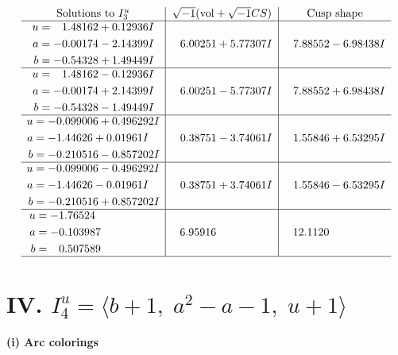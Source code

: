 \documentclass[1p]{elsarticle_modified}
\theoremstyle{definition}
\newcommand{\I}{\sqrt{-1}}
\begin{document}
$$\begin{array}{c|c|c}  
\text{Solutions to }I^u_{3}& \I (\text{vol} + \sqrt{-1}CS) & \text{Cusp shape}\\
 \hline 
\begin{aligned}
u &= \phantom{-}1.48162 + 0.12936 I \\
a &= -0.00174 - 2.14399 I \\
b &= -0.54328 + 1.49449 I\end{aligned}
 & \phantom{-}6.00251 + 5.77307 I & \phantom{-}7.88552 - 6.98438 I \\ \hline\begin{aligned}
u &= \phantom{-}1.48162 - 0.12936 I \\
a &= -0.00174 + 2.14399 I \\
b &= -0.54328 - 1.49449 I\end{aligned}
 & \phantom{-}6.00251 - 5.77307 I & \phantom{-}7.88552 + 6.98438 I \\ \hline\begin{aligned}
u &= -0.099006 + 0.496292 I \\
a &= -1.44626 + 0.01961 I \\
b &= -0.210516 - 0.857202 I\end{aligned}
 & \phantom{-}0.38751 - 3.74061 I & \phantom{-}1.55846 + 6.53295 I \\ \hline\begin{aligned}
u &= -0.099006 - 0.496292 I \\
a &= -1.44626 - 0.01961 I \\
b &= -0.210516 + 0.857202 I\end{aligned}
 & \phantom{-}0.38751 + 3.74061 I & \phantom{-}1.55846 - 6.53295 I \\ \hline\begin{aligned}
u &= -1.76524\phantom{ +0.000000I} \\
a &= -0.103987\phantom{ +0.000000I} \\
b &= \phantom{-}0.507589\phantom{ +0.000000I}\end{aligned}
 & \phantom{-}6.95916\phantom{ +0.000000I} & \phantom{-}12.1120\phantom{ +0.000000I}\\
 \hline 
 \end{array}$$\newpage\newpage\renewcommand{\arraystretch}{1}
\centering \section*{IV. $I^u_{4}= \langle b+1,\;a^2- a-1,\;u+1 \rangle$}
\flushleft \textbf{(i) Arc colorings}\\
\end{document}
